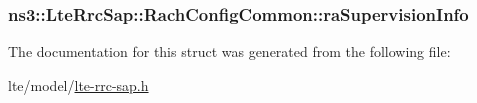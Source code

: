 \subsubsection[{\texorpdfstring{ra\+Supervision\+Info}{raSupervisionInfo}}]{ ns3\+::\+Lte\+Rrc\+Sap\+::\+Rach\+Config\+Common\+::ra\+Supervision\+Info}\hypertarget{structns3_1_1LteRrcSap_1_1RachConfigCommon_ab62e223ba80f1d2d4618481ee04e07cd}{}\label{structns3_1_1LteRrcSap_1_1RachConfigCommon_ab62e223ba80f1d2d4618481ee04e07cd}


The documentation for this struct was generated from the following file\+:\begin{DoxyCompactItemize}
\item 
lte/model/\hyperlink{lte-rrc-sap_8h}{lte-\/rrc-\/sap.\+h}\end{DoxyCompactItemize}
